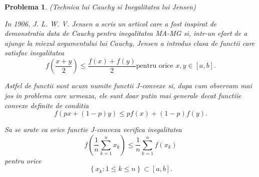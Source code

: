 \documentclass[a4paper,12pt,oneside]{report}
\newtheorem{problem}{Problema}
\begin{document}
\begin{problem} (Technica lui Cauchy si Inegalitatea lui Jensen)

In 1906, J. L. W. V. Jensen a scris un articol care a fost inspirat de demonstratia data de Cauchy pentru inegalitatea MA-MG si, intr-un efort de a ajunge la miezul argumentului lui Cauchy, Jensen a introdus clasa de functii care satisfac inegalitatea
\begin{displaymath}
  f\left ( \frac{x + y}{2} \right ) \leq \frac{f\left ( x \right ) + f\left ( y \right )}{2} \text{pentru orice } x,y \in \left [ a, b \right ]. \label{eq:2.14} \tag{2.14}
\end{displaymath}

Astfel de functii sunt acum numite functii J-convexe si, dupa cum observam mai jos in problema care urmeaza, ele sunt doar putin mai generale decat functiie convexe definite de conditia
\begin{displaymath}
  f\left ( px + \left ( 1 - p \right )y \right )\leq pf\left ( x \right ) + \left ( 1-p \right )f\left ( y \right ).
\end{displaymath}

Sa se arate ca orice functie  J-convexa verifica inegalitatea
\begin{displaymath}
  f\left ( \frac{1}{n} \sum_{k = 1}^{n}x_{k}\right )\leq \frac{1}{n}\sum_{k = 1}^{n}f\left ( x_{k} \right )
\end{displaymath}
pentru orice
\begin{displaymath}
  \left \{ x_{k}: 1\leq k \leq n \right \} \subset \left [ a, b \right ]. \label{eq:2.15} \tag{2.15}
\end{displaymath}
\end{problem}
\end{document}
